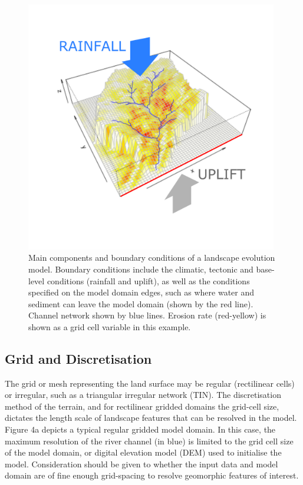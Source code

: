 \begin{figure}[t]
\includegraphics[width=11cm]{LEMFinalRevisedmanuscriptDAVFinalrevisions-img/LEMFinalRevisedmanuscriptDAVFinalrevisions-img004.png} 
\caption{Main components and boundary conditions of a landscape evolution model. Boundary conditions include the climatic, tectonic and base-level conditions (rainfall and uplift), as well as the conditions specified on the model domain edges, such as where water and sediment can leave the model domain (shown by the red line). Channel network shown by blue lines. Erosion rate (red-yellow) is shown as a grid cell variable in this example.}
\label{fig_main_LEM_components}
\end{figure}


\subsection{Grid and Discretisation}
The grid or mesh representing the land surface may be regular (rectilinear cells) or irregular, such as a triangular irregular network (TIN). The discretisation method of the terrain, and for rectilinear gridded domains the grid-cell size, dictates the length scale of landscape features that can be resolved in the model. Figure 4a depicts a typical regular gridded model domain. In this case, the maximum resolution of the river channel (in blue) is limited to the grid cell size of the model domain, or digital elevation model (DEM) used to initialise the model. Consideration should be given to whether the input data and model domain are of fine enough grid-spacing to resolve geomorphic features of interest.

